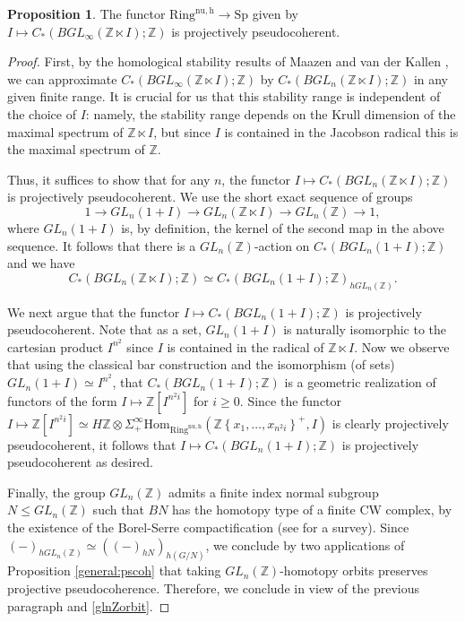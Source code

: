 \documentclass{amsart}
\renewcommand{\hom}{\mathrm{Hom}}
\newcommand{\Sp}{\mathrm{Sp}}
\theoremstyle{definition}
\newtheorem{proposition}[definition]{Proposition}
\newcommand{\nuzh}{\mathrm{Ring}^{\mathrm{nu,h}}}
\begin{document}
\begin{proposition} 
\label{glpscoh}
The functor 
$ \nuzh
\to \Sp$
given by 
$I \mapsto C_*( BGL_\infty(\mathbb{Z} \ltimes I); \mathbb{Z})$  is
projectively
pseudocoherent. 
\end{proposition}
\begin{proof} 
First, by the homological stability results of Maazen and van der Kallen
\cite{vdK}, we can approximate $C_*(BGL_\infty(\mathbb{Z} \ltimes I);
\mathbb{Z})$ by 
$C_*(BGL_n(\mathbb{Z} \ltimes I);
\mathbb{Z})$ in any given finite range. It is crucial for us that this stability range is independent of
the choice of $I$: namely, the stability range depends on the Krull dimension of
the maximal spectrum of $\mathbb{Z} \ltimes I$, but since $I$ is contained
in the Jacobson radical this is the maximal spectrum of $\mathbb{Z}$. 

Thus, it suffices to show that for any $n$, the functor $I \mapsto
C_*(BGL_n(\mathbb{Z} \ltimes I); \mathbb{Z})$ is projectively pseudocoherent. We use the short
exact sequence of groups
\[ 1 \to GL_n(1 + I) \to GL_n( \mathbb{Z} \ltimes I) \to GL_n(\mathbb{Z}) \to 1,  \]
where $GL_n(1 + I)$ is, by definition, the kernel of the second map in the above
sequence. It follows that 
there is a $GL_n(\mathbb{Z})$-action on 
$C_*(BGL_n(1 + I);
\mathbb{Z})$ and we have
\begin{equation} \label{glnZorbit} C_*(BGL_n(\mathbb{Z} \ltimes I); \mathbb{Z})
\simeq C_*(BGL_n(1 + I);
\mathbb{Z})_{h GL_n(\mathbb{Z})}.  \end{equation}


We next argue that the functor 
$I \mapsto C_*(BGL_n(1 + I); \mathbb{Z})$ is projectively pseudocoherent. 
Note that as a set, $GL_n(1 + I)$ is naturally isomorphic to the
cartesian product  $I^{n^2}$ since $I$ is contained in
the radical of $\mathbb{Z} \ltimes I$. 
Now we observe that using the classical bar construction and the
isomorphism (of sets) 
$GL_n(1 + I) \simeq I^{n^2}$, that 
$C_*(BGL_n(1 + I); \mathbb{Z})$ is a geometric realization of
functors of the form $I \mapsto \mathbb{Z}[I^{n^2i}]$ for $i \geq 0$. Since 
the functor
$I \mapsto \mathbb{Z}[I^{n^2i}] 
 \simeq H \mathbb{Z} \otimes \Sigma^\infty_+
 \hom_{\nuzh}(\mathbb{Z}\left\{x_1, \dots, x_{n^2i}\right\}^+, I)$ is clearly 
projectively pseudocoherent, it follows that 
$I \mapsto C_*(BGL_n(1 +I); \mathbb{Z})$ is projectively pseudocoherent as desired. 

Finally, the group $GL_n(\mathbb{Z})$ admits a finite index normal subgroup $N \leq
GL_n(\mathbb{Z})$ such that $BN$ has the homotopy type of a finite CW complex,
by the existence of the Borel-Serre compactification (see \cite{Serresurvey}
for a survey). Since $(-)_{hGL_n(\mathbb{Z})} \simeq ((-)_{hN})_{h(G/N)}$, we conclude by two applications of Proposition \ref{general:pscoh} that taking $GL_n(\mathbb{Z})$-homotopy orbits preserves projective
pseudocoherence. Therefore, 
we conclude in view of the previous paragraph and \eqref{glnZorbit}. 
\end{proof} 
\end{document}
